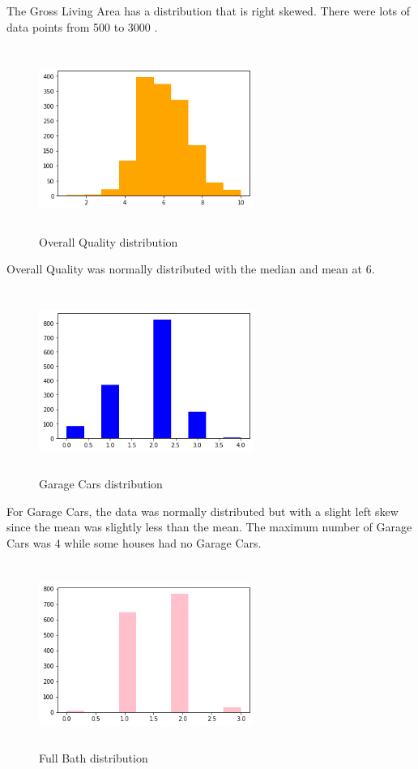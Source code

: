 \documentclass[fleqn,10pt]{SelfArx} %
\begin{document}
The Gross Living Area has a distribution that is right skewed. There were lots of data points from 500 to 3000 . 
\begin{figure}[H]
    \centering
    \includegraphics[width=7cm, height=6cm]{img/Overallhis.png}
    \caption{Overall Quality distribution}
    \label{fig:my_label}
\end{figure}
Overall Quality was normally distributed with the median and mean at 6. 
\begin{figure}[H]
    \centering
    \includegraphics[width=7cm, height=6cm]{img/GraageCarshist.png}
    \caption{Garage Cars distribution}
    \label{fig:my_label}
\end{figure}
For Garage Cars, the data was normally distributed but with a slight left skew since the mean was slightly less than the mean. The maximum number of Garage Cars was 4 while some houses had no Garage Cars.
\begin{figure}[H]
    \centering
    \includegraphics[width=7cm, height=6cm]{img/Fullbathhist.png}
    \caption{Full Bath distribution}
    \label{fig:my_label}
\end{figure}
\end{document}
